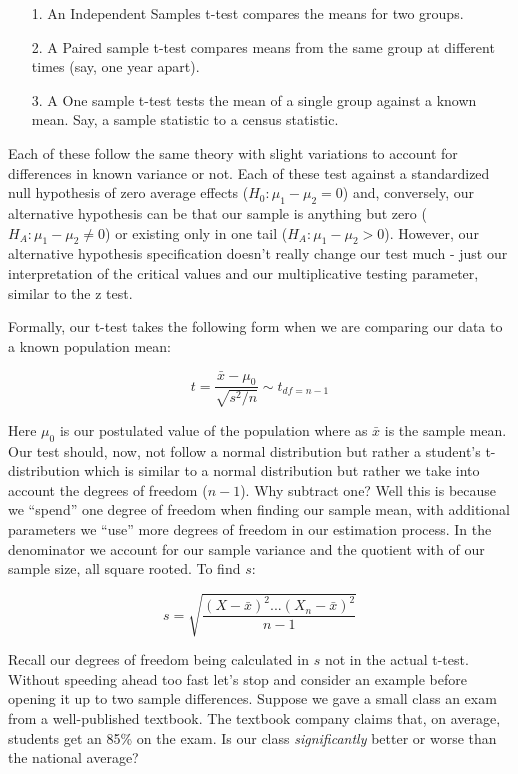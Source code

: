 \documentclass[12pt]{article}\usepackage[]{graphicx}\usepackage[]{color}
\begin{document}
\begin{flushleft}
\begin{itemize}
\item[1.] An Independent Samples t-test compares the means for two groups.
\item[2.] A Paired sample t-test compares means from the same group at different times (say, one year apart).
\item[3.] A One sample t-test tests the mean of a single group against a known mean. Say, a sample statistic to a census statistic.
\end{itemize}

Each of these follow the same theory with slight variations to account for differences in known variance or not. Each of these test against a standardized null hypothesis of zero average effects ($ H_0 : \mu_1 - \mu_2 = 0$) and, conversely, our alternative hypothesis can be that our sample is anything but zero ($H_A : \mu_1 - \mu_2 \neq 0$) or existing only in one tail ($H_A : \mu_1 - \mu_2 > 0$). However, our alternative hypothesis specification doesn't really change our test much - just our interpretation of the critical values and our multiplicative testing parameter, similar to the z test.

Formally, our t-test takes the following form when we are comparing our data to a known population mean:

$$ t = \frac{\bar{x} - \mu_0}{\sqrt{s^2 / n}} \sim t_{df=n-1} $$

Here $\mu_0$ is our postulated value of the population where as $\bar{x}$ is the sample mean. Our test should, now, not follow a normal distribution but rather a student's t-distribution which is similar to a normal distribution but rather we take into account the degrees of freedom ($n-1$). Why subtract one? Well this is because we ``spend'' one degree of freedom when finding our sample mean, with additional parameters we ``use'' more degrees of freedom in our estimation process. In the denominator we account for our sample variance and the quotient with of our sample size, all square rooted. To find $s$:

$$s = \sqrt{\frac{(X-\bar{x})^2 \text{...} (X_n - \bar{x})^2 }{n-1} } $$

Recall our degrees of freedom being calculated in $s$ not in the actual t-test. Without speeding ahead too fast let's stop and consider an example before opening it up to two sample differences. Suppose we gave a small class an exam from a well-published textbook. The textbook company claims that, on average, students get an 85\% on the exam. Is our class \textit{significantly} better or worse than the national average?


\end{flushleft}
\end{document}
